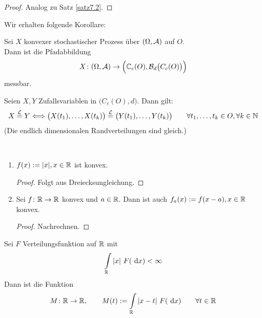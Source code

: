 \begin{proof}
	Analog zu Satz \ref{satz7.2}.
\end{proof}


Wir erhalten folgende Korollare:

\begin{korollar}\label{korollar9.3}
	 Sei $X$ konvexer stochastischer Prozess über $(\Omega,\mathcal{A})$ auf $O$.\\
	 Dann ist die Pfadabbildung
	 \begin{align*}
	 	X\colon(\Omega,\mathcal{A})\to\Big(\mathbb{C}_c(O),\mathcal{B}_d\big(C_c(O)\big)\Big)
	 \end{align*}
	 messbar.
\end{korollar}

\begin{korollar}\label{korollar9.4} %
	Seien $X,Y$ Zufallsvariablen in $\big(C_c(O),d\big)$.
	Dann gilt:
	\begin{align*}
		X\overset{\mathcal{L}}{=} Y\Longleftrightarrow
		\big(X(t_1),\ldots,X(t_k)\big)
		\overset{\mathcal{L}}{=}
		\big(Y(t_1),\ldots,Y(t_k)\big)
		\qquad\forall t_1,\ldots,t_k\in O,\forall k\in\mathbb{N}
	\end{align*}
	(Die endlich dimensionalen Randverteilungen sind gleich.)
\end{korollar}

\begin{beispiel}\label{beispiel9.5}\
	\begin{enumerate}[label=(\arabic*)]
		\item $f(x):=|x|,x\in\mathbb{R}$ ist konvex.
		\begin{proof}
			Folgt aus Dreiecksungleichung.
		\end{proof}
		\item Sei $f\colon\mathbb{R}\to\mathbb{R}$ konvex und $a\in\mathbb{R}$.
		Dann ist auch $f_a(x):=f(x-a),x\in\mathbb{R}$ konvex.
		\begin{proof}
			Nachrechnen.
		\end{proof}
	\end{enumerate}
\end{beispiel}

\begin{lemma}\label{lemma9.6}
	Sei $F$ Verteilungsfunktion auf $\mathbb{R}$ mit
	\begin{align*}
		\int\limits_{\mathbb{R}} |x|~F(\text{ d} x)<\infty
	\end{align*}
	Dann ist die Funktion
	\begin{align*}
		M\colon\mathbb{R}\to\mathbb{R},\qquad M(t):=\int\limits_{\mathbb{R}}|x-t|~F(\text{ d} x)\qquad\forall t\in\mathbb{R}
	\end{align*}
\end{lemma}

